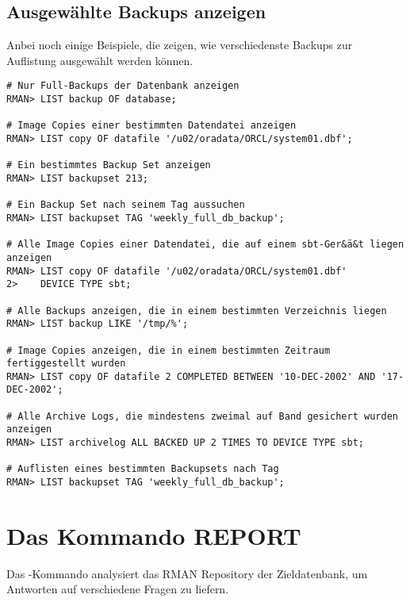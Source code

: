       \subsection{Ausgewählte Backups anzeigen}
        Anbei noch einige Beispiele, die zeigen, wie verschiedenste Backups zur Auflistung ausgewählt werden können.
        \begin{lstlisting}[caption={Auflistungen eingrenzen},label=admin1352,language=rman]
# Nur Full-Backups der Datenbank anzeigen
RMAN> LIST backup OF database;

# Image Copies einer bestimmten Datendatei anzeigen
RMAN> LIST copy OF datafile '/u02/oradata/ORCL/system01.dbf';

# Ein bestimmtes Backup Set anzeigen
RMAN> LIST backupset 213;

# Ein Backup Set nach seinem Tag aussuchen
RMAN> LIST backupset TAG 'weekly_full_db_backup';

# Alle Image Copies einer Datendatei, die auf einem sbt-Ger&ä&t liegen anzeigen
RMAN> LIST copy OF datafile '/u02/oradata/ORCL/system01.dbf'
2>    DEVICE TYPE sbt;

# Alle Backups anzeigen, die in einem bestimmten Verzeichnis liegen
RMAN> LIST backup LIKE '/tmp/%';

# Image Copies anzeigen, die in einem bestimmten Zeitraum fertiggestellt wurden
RMAN> LIST copy OF datafile 2 COMPLETED BETWEEN '10-DEC-2002' AND '17-DEC-2002';

# Alle Archive Logs, die mindestens zweimal auf Band gesichert wurden anzeigen
RMAN> LIST archivelog ALL BACKED UP 2 TIMES TO DEVICE TYPE sbt;

# Auflisten eines bestimmten Backupsets nach Tag
RMAN> LIST backupset TAG 'weekly_full_db_backup';
          \end{lstlisting}
    \section{Das Kommando REPORT}
      Das -Kommando analysiert das RMAN Repository der Zieldatenbank, um Antworten auf verschiedene Fragen zu liefern.
